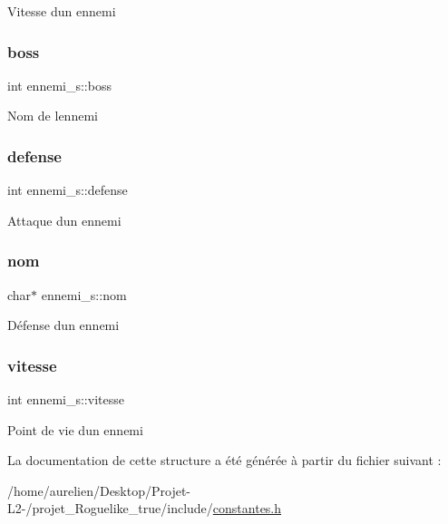 Vitesse d\textquotesingle{}un ennemi \mbox{\label{structennemi__s_a38a4d8c90aba3e83b1d13fbef1613e6a}} 
\subsubsection{\texorpdfstring{boss}{boss}}
{\footnotesize\ttfamily int ennemi\+\_\+s\+::boss}

Nom de l\textquotesingle{}ennemi \mbox{\label{structennemi__s_a8e04831164889e636a03551f33167ac9}} 
\subsubsection{\texorpdfstring{defense}{defense}}
{\footnotesize\ttfamily int ennemi\+\_\+s\+::defense}

Attaque d\textquotesingle{}un ennemi \mbox{\label{structennemi__s_a0928cbeee6295b778f04976ef3bd7e03}} 
\subsubsection{\texorpdfstring{nom}{nom}}
{\footnotesize\ttfamily char$\ast$ ennemi\+\_\+s\+::nom}

Défense d\textquotesingle{}un ennemi \mbox{\label{structennemi__s_a2209ba506bbe6b6bfba8434837deba28}} 
\subsubsection{\texorpdfstring{vitesse}{vitesse}}
{\footnotesize\ttfamily int ennemi\+\_\+s\+::vitesse}

Point de vie d\textquotesingle{}un ennemi 

La documentation de cette structure a été générée à partir du fichier suivant \+:\begin{DoxyCompactItemize}
\item 
/home/aurelien/\+Desktop/\+Projet-\/\+L2-\//projet\+\_\+\+Roguelike\+\_\+true/include/\hyperlink{constantes_8h}{constantes.\+h}\end{DoxyCompactItemize}
